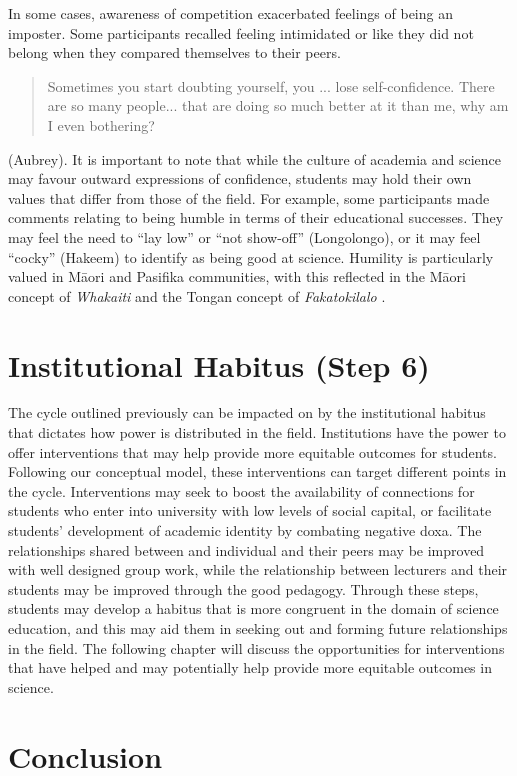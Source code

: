 In some cases, awareness of competition exacerbated feelings of being an imposter. Some participants recalled feeling intimidated or like they did not belong when they compared themselves to their peers. \blockquote{Sometimes you start doubting yourself, you ... lose self-confidence. There are so many people... that are doing so much better at it than me, why am I even bothering?} (Aubrey). It is important to note that while the culture of academia and science may favour outward expressions of confidence, students may hold their own values that differ from those of the field. For example, some participants made comments relating to being humble in terms of their educational successes. They may feel the need to ``lay low'' or ``not show-off'' (Longolongo), or it may feel ``cocky'' (Hakeem) to identify as being good at science. Humility is particularly valued in M\={a}ori and Pasifika communities, with this reflected in the M\={a}ori concept of \textit{Whakaiti} \cite{haar2018indigenous} and the Tongan concept of \textit{Fakatokilalo} \cite{mafile2004exploring}. 

\section{Institutional Habitus (Step 6)}
The cycle outlined previously can be impacted on by the institutional habitus that dictates how power is distributed in the field. Institutions have the power to offer interventions that may help provide more equitable outcomes for students. Following our conceptual model, these interventions can target different points in the cycle. Interventions may seek to boost the availability of connections for students who enter into university with low levels of social capital, or facilitate students' development of academic identity by combating negative doxa. The relationships shared between and individual and their peers may be improved with well designed group work, while the relationship between lecturers and their students may be improved through the good pedagogy. Through these steps, students may develop a habitus that is more congruent in the domain of science education, and this may aid them in seeking out and forming future relationships in the field. The following chapter will discuss the opportunities for interventions that have helped and may potentially help provide more equitable outcomes in science. 

\section{Conclusion}



